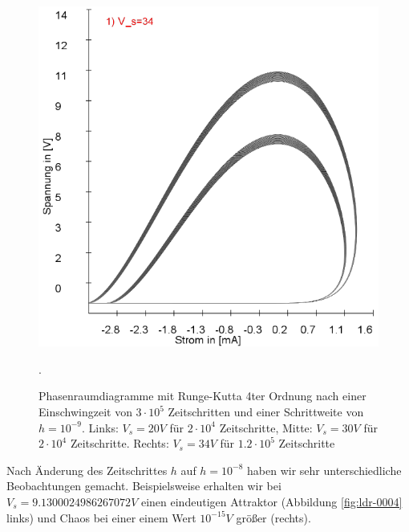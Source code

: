 \documentclass[11,5pt, twoside]{article}
\begin{document}
\begin{figure}[!htbp]
\includegraphics[scale=0.26]{schwing-runge-nach300k-weitere120k-10-9-34V}
\caption{Phasenraumdiagramme mit Runge-Kutta 4ter Ordnung nach einer Einschwingzeit von  $3\cdot10^5$ Zeitschritten und einer Schrittweite von $h=10^{-9}$. Links: $V_s=20V$ für $2\cdot10^4$ Zeitschritte, Mitte: $V_s=30V$ für $2\cdot10^4$ Zeitschritte. Rechts: $V_s=34V$ für $1.2\cdot10^5$ Zeitschritte}. 
\label{fig:ldr-0003}
\end{figure}
\newline
Nach Änderung des Zeitschrittes $h$ auf $h=10^{-8}$ haben wir sehr unterschiedliche Beobachtungen gemacht. Beispielsweise erhalten wir bei $V_s=9.1300024986267072V$ einen eindeutigen Attraktor (Abbildung \ref{fig:ldr-0004} links) und Chaos bei einer einem Wert $10^{-15}V$ größer (rechts).
\end{document}
